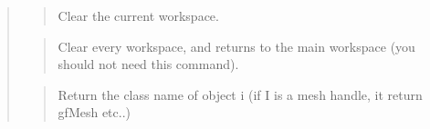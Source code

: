 \documentclass[a4paper,11pt,english]{sphinxmanual}
\begin{document}
\begin{quote}
\sphinxAtStartPar
{}
\begin{quote}

\sphinxAtStartPar
Clear the current workspace.
\end{quote}

\sphinxAtStartPar
{}
\begin{quote}

\sphinxAtStartPar
Clear every workspace, and returns to the main workspace (you
should not need this command).
\end{quote}

\sphinxAtStartPar
{}
\begin{quote}

\sphinxAtStartPar
Return the class name of object i (if I is a mesh handle, it
return gfMesh etc..)
\end{quote}
\end{quote}



\renewcommand{\indexname}{Index}
\printindex
\end{document}
